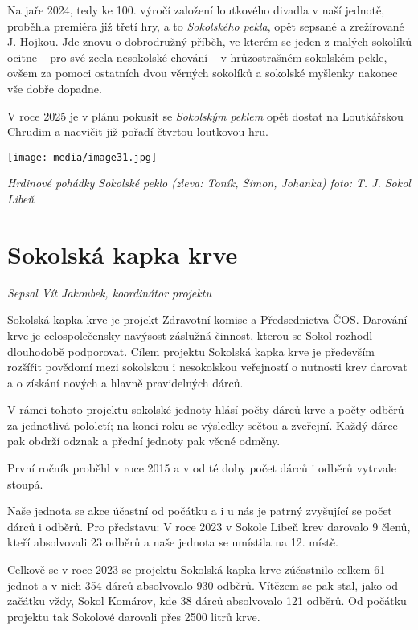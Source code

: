 Na jaře 2024, tedy ke 100. výročí založení loutkového divadla v naší
jednotě, proběhla premiéra již třetí hry, a to \emph{Sokolského pekla},
opět sepsané a zrežírované J. Hojkou. Jde znovu o dobrodružný příběh, ve
kterém se jeden z malých sokolíků ocitne -- pro své zcela nesokolské
chování -- v hrůzostrašném sokolském pekle, ovšem za pomoci ostatních
dvou věrných sokolíků a sokolské myšlenky nakonec vše dobře dopadne.

V roce 2025 je v plánu pokusit se \emph{Sokolským peklem} opět dostat na
Loutkářskou Chrudim a nacvičit již pořadí čtvrtou loutkovou hru.

\texttt{[image: media/image31.jpg]}

\emph{Hrdinové pohádky Sokolské peklo (zleva: Toník, Šimon, Johanka)
foto:} \emph{T. J. Sokol Libeň}

\section{Sokolská kapka krve}\label{sokolskuxe1-kapka-krve}

\emph{Sepsal Vít Jakoubek, koordinátor projektu}

Sokolská kapka krve je projekt Zdravotní komise a Předsednictva ČOS.
Darování krve je celospolečensky navýsost záslužná činnost, kterou se
Sokol rozhodl dlouhodobě podporovat. Cílem projektu Sokolská kapka krve
je především rozšířit povědomí mezi sokolskou i nesokolskou veřejností o
nutnosti krev darovat a o získání nových a hlavně pravidelných dárců.

V rámci tohoto projektu sokolské jednoty hlásí počty dárců krve a počty
odběrů za jednotlivá pololetí; na konci roku se výsledky sečtou a
zveřejní. Každý dárce pak obdrží odznak a přední jednoty pak věcné
odměny.

První ročník proběhl v roce 2015 a v od té doby počet dárců i odběrů
vytrvale stoupá.

Naše jednota se akce účastní od počátku a i u nás je patrný zvyšující se
počet dárců i odběrů. Pro představu: V roce 2023 v Sokole Libeň krev
darovalo 9 členů, kteří absolvovali 23 odběrů a naše jednota se umístila
na 12. místě.

Celkově se v roce 2023 se projektu Sokolská kapka krve zúčastnilo celkem
61 jednot a v nich 354 dárců absolvovalo 930 odběrů. Vítězem se pak
stal, jako od začátku vždy, Sokol Komárov, kde 38 dárců absolvovalo 121
odběrů. Od počátku projektu tak Sokolové darovali přes 2500 litrů krve.

